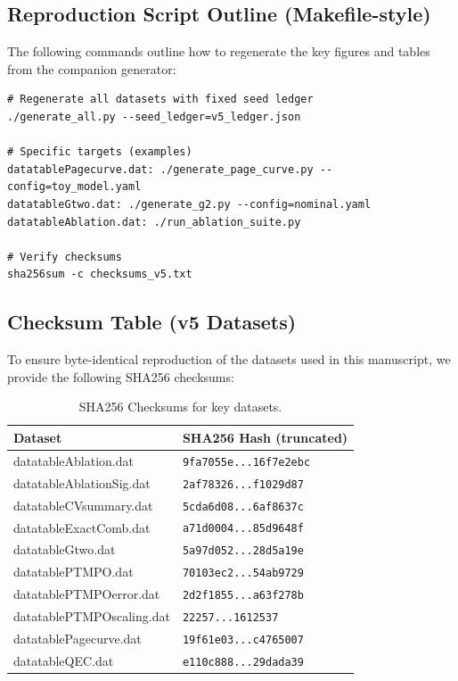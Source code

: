 \documentclass[aps,prd,preprint,onecolumn,superscriptaddress,nofootinbib,longbibliography,floatfix,11pt,showpacs,showkeys]{revtex4-2}
\theoremstyle{plain}
\theoremstyle{definition}
\theoremstyle{remark}
\begin{document}
\subsection{Reproduction Script Outline (Makefile-style)}
The following commands outline how to regenerate the key figures and tables from the companion generator:
\begin{verbatim}
# Regenerate all datasets with fixed seed ledger
./generate_all.py --seed_ledger=v5_ledger.json

# Specific targets (examples)
datatablePagecurve.dat: ./generate_page_curve.py --config=toy_model.yaml
datatableGtwo.dat: ./generate_g2.py --config=nominal.yaml
datatableAblation.dat: ./run_ablation_suite.py

# Verify checksums
sha256sum -c checksums_v5.txt
\end{verbatim}

\subsection{Checksum Table (v5 Datasets)}
To ensure byte-identical reproduction of the datasets used in this manuscript, we provide the following SHA256 checksums:
\begin{table}[h]
\centering
\caption{SHA256 Checksums for key datasets.}
\label{tab:checksums}
\footnotesize
\begin{tabular*}{\textwidth}{@{\extracolsep{\fill}}ll@{}}
\toprule
\textbf{Dataset} & \textbf{SHA256 Hash (truncated)} \\
\midrule
datatableAblation.dat & {\tiny\texttt{9fa7055e...16f7e2ebc}} \\
datatableAblationSig.dat & {\tiny\texttt{2af78326...f1029d87}} \\
datatableCVsummary.dat & {\tiny\texttt{5cda6d08...6af8637c}} \\
datatableExactComb.dat & {\tiny\texttt{a71d0004...85d9648f}} \\
datatableGtwo.dat & {\tiny\texttt{5a97d052...28d5a19e}} \\
datatablePTMPO.dat & {\tiny\texttt{70103ec2...54ab9729}} \\
datatablePTMPOerror.dat & {\tiny\texttt{2d2f1855...a63f278b}} \\
datatablePTMPOscaling.dat & {\tiny\texttt{22257...1612537}} \\
datatablePagecurve.dat & {\tiny\texttt{19f61e03...c4765007}} \\
datatableQEC.dat & {\tiny\texttt{e110c888...29dada39}} \\
\bottomrule
\end{tabular*}
\end{table}
\end{document}
